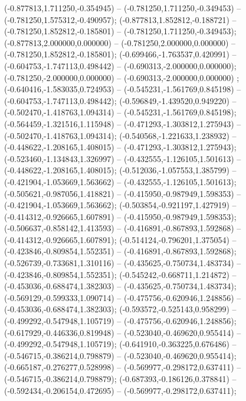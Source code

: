  (-0.877813,1.711250,-0.354945) -- (-0.781250,1.711250,-0.349453) -- (-0.781250,1.575312,-0.490957);
 (-0.877813,1.852812,-0.188721) -- (-0.781250,1.852812,-0.185801) -- (-0.781250,1.711250,-0.349453);
 (-0.877813,2.000000,0.000000) -- (-0.781250,2.000000,0.000000) -- (-0.781250,1.852812,-0.185801);
 (-0.699466,-1.763537,0.420991) -- (-0.604753,-1.747113,0.498442) -- (-0.690313,-2.000000,0.000000);
 (-0.781250,-2.000000,0.000000) -- (-0.690313,-2.000000,0.000000) ;
 (-0.640416,-1.583035,0.724953) -- (-0.545231,-1.561769,0.845198) -- (-0.604753,-1.747113,0.498442);
 (-0.596849,-1.439520,0.949220) -- (-0.502470,-1.418763,1.094314) -- (-0.545231,-1.561769,0.845198);
 (-0.564459,-1.321516,1.115948) -- (-0.471293,-1.303812,1.275943) -- (-0.502470,-1.418763,1.094314);
 (-0.540568,-1.221633,1.238932) -- (-0.448622,-1.208165,1.408015) -- (-0.471293,-1.303812,1.275943);
 (-0.523460,-1.134843,1.326997) -- (-0.432555,-1.126105,1.501613) -- (-0.448622,-1.208165,1.408015);
 (-0.512036,-1.057553,1.385799) -- (-0.421904,-1.053669,1.563662) -- (-0.432555,-1.126105,1.501613);
 (-0.505621,-0.987056,1.418821) -- (-0.415950,-0.987949,1.598353) -- (-0.421904,-1.053669,1.563662);
 (-0.503854,-0.921197,1.427919) -- (-0.414312,-0.926665,1.607891) -- (-0.415950,-0.987949,1.598353);
 (-0.506637,-0.858142,1.413593) -- (-0.416891,-0.867893,1.592868) -- (-0.414312,-0.926665,1.607891);
 (-0.514124,-0.796201,1.375054) -- (-0.423846,-0.809854,1.552351) -- (-0.416891,-0.867893,1.592868);
 (-0.526739,-0.733681,1.310116) -- (-0.435625,-0.750734,1.483734) -- (-0.423846,-0.809854,1.552351);
 (-0.545242,-0.668711,1.214872) -- (-0.453036,-0.688474,1.382303) -- (-0.435625,-0.750734,1.483734);
 (-0.569129,-0.599333,1.090714) -- (-0.475756,-0.620946,1.248856) -- (-0.453036,-0.688474,1.382303);
 (-0.593572,-0.525143,0.958299) -- (-0.499292,-0.547948,1.105719) -- (-0.475756,-0.620946,1.248856);
 (-0.617929,-0.446336,0.819948) -- (-0.523040,-0.469620,0.955414) -- (-0.499292,-0.547948,1.105719);
 (-0.641910,-0.363225,0.676486) -- (-0.546715,-0.386214,0.798879) -- (-0.523040,-0.469620,0.955414);
 (-0.665187,-0.276277,0.528998) -- (-0.569977,-0.298172,0.637411) -- (-0.546715,-0.386214,0.798879);
 (-0.687393,-0.186126,0.378841) -- (-0.592434,-0.206154,0.472695) -- (-0.569977,-0.298172,0.637411);
